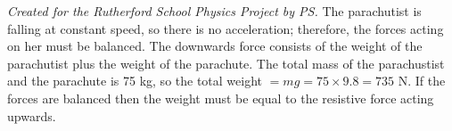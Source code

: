 
\begin{problem}
{ 
}
{\textit{Created for the Rutherford School Physics Project by PS.}}
{The parachutist is falling at constant speed, so there is no acceleration; therefore, the forces acting on her must be balanced. The downwards force consists of the weight of the parachutist plus the weight of the parachute. The total mass of the parachustist and the parachute is 75 kg, so the total weight $= mg = 75 \times 9.8 = 735$ N. If the forces are balanced then the weight must be equal to the resistive force acting upwards. 
}
\end{problem}